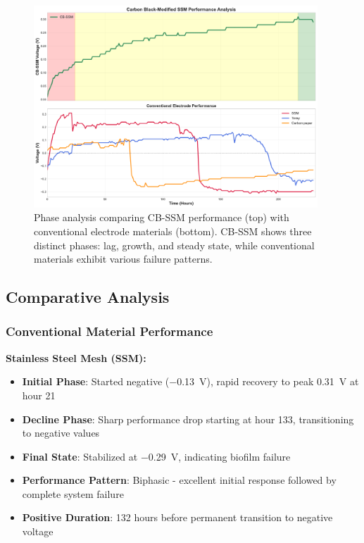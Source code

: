 \documentclass[12pt,a4paper]{article}
\begin{document}
\begin{figure}[H]
\centering
\includegraphics[width=0.95\textwidth]{phase_analysis.pdf}
\caption{Phase analysis comparing CB-SSM performance (top) with conventional electrode materials (bottom). CB-SSM shows three distinct phases: lag, growth, and steady state, while conventional materials exhibit various failure patterns.}
\label{fig:phase_analysis}
\end{figure}

\subsection{Comparative Analysis}

\subsubsection{Conventional Material Performance}

\textbf{Stainless Steel Mesh (SSM):}
\begin{itemize}
    \item \textbf{Initial Phase}: Started negative (\SI{-0.13}{\volt}), rapid recovery to peak \SI{+0.31}{\volt} at hour 21
    \item \textbf{Decline Phase}: Sharp performance drop starting at hour 133, transitioning to negative values
    \item \textbf{Final State}: Stabilized at \SI{-0.29}{\volt}, indicating biofilm failure
    \item \textbf{Performance Pattern}: Biphasic - excellent initial response followed by complete system failure
    \item \textbf{Positive Duration}: 132 hours before permanent transition to negative voltage
\end{itemize}
\end{document}
